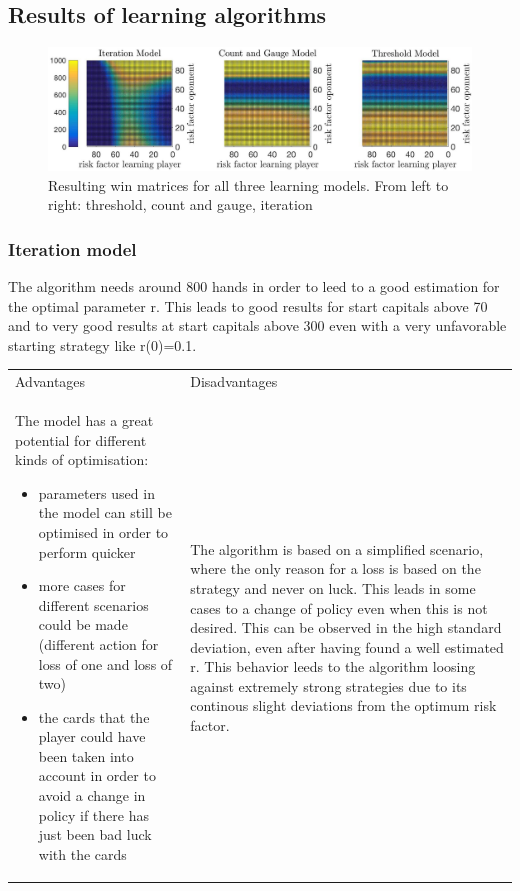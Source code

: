 \documentclass[11pt]{article}
\begin{document}
\subsection{Results of learning algorithms}

\begin{center}
\begin{figure}

\includegraphics[scale=.23]{Graphics/OvViewLatex18}
\caption{Resulting win matrices for all three learning models. From left to right: threshold, count and gauge, iteration}
\label{LearningModelsAllDataOverview}

\end{figure}
\end{center}


\subsubsection{Iteration model}

The algorithm needs around 800 hands in order to leed to a good estimation for the optimal parameter r. This leads to good results for start capitals above 70 and to very good results at start capitals above 300 even with a very unfavorable starting strategy like r(0)=0.1.
\\

\begin{tabular}{ p{7.2cm}  p{7.2cm}}
Advantages & Disadvantages\\
The model has a great potential for different kinds of optimisation:
\begin{itemize}
\item parameters used in the model can still be optimised in order to perform quicker
\item more cases for different scenarios could be made (different action for loss of one and loss of two)
\item the cards that the player could have been taken into account in order to avoid a change in policy if there has just been bad luck with the cards 
\end{itemize}
& The algorithm is based on a simplified scenario, where the only reason for a loss is based on the strategy and never on luck. This leads in some cases to a change of policy even when this is not desired. This can be observed in the high standard deviation, even after having found a well estimated r. This behavior leeds to the algorithm loosing against extremely strong strategies due to its continous slight deviations from the optimum risk factor.\\ 
\end{tabular}
\end{document}
